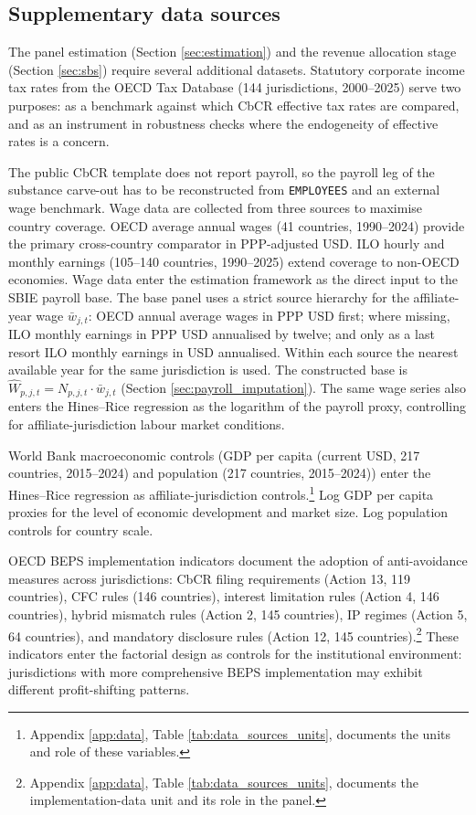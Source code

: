 \documentclass[11pt,a4paper]{article}
\newcommand{\code}[1]{\texttt{#1}}
\begin{document}
\subsection{Supplementary data sources}\label{sec:supplementary}

The panel estimation (Section \ref{sec:estimation}) and the revenue allocation stage (Section \ref{sec:sbs}) require several additional datasets. Statutory corporate income tax rates from the OECD Tax Database (144 jurisdictions, 2000--2025) serve two purposes: as a benchmark against which CbCR effective tax rates are compared, and as an instrument in robustness checks where the endogeneity of effective rates is a concern.

The public CbCR template does not report payroll, so the payroll leg of the substance carve-out has to be reconstructed from \code{EMPLOYEES} and an external wage benchmark. Wage data are collected from three sources to maximise country coverage. OECD average annual wages (41 countries, 1990--2024) provide the primary cross-country comparator in PPP-adjusted USD. ILO hourly and monthly earnings (105--140 countries, 1990--2025) extend coverage to non-OECD economies. Wage data enter the estimation framework as the direct input to the SBIE payroll base. The base panel uses a strict source hierarchy for the affiliate-year wage $\bar{w}_{j,t}$: OECD annual average wages in PPP USD first; where missing, ILO monthly earnings in PPP USD annualised by twelve; and only as a last resort ILO monthly earnings in USD annualised. Within each source the nearest available year for the same jurisdiction is used. The constructed base is $\hat{W}_{p,j,t} = N_{p,j,t} \cdot \bar{w}_{j,t}$ (Section \ref{sec:payroll_imputation}). The same wage series also enters the Hines--Rice regression as the logarithm of the payroll proxy, controlling for affiliate-jurisdiction labour market conditions.

World Bank macroeconomic controls (GDP per capita (current USD, 217 countries, 2015--2024) and population (217 countries, 2015--2024)) enter the Hines--Rice regression as affiliate-jurisdiction controls.\footnote{Appendix \ref{app:data}, Table \ref{tab:data_sources_units}, documents the units and role of these variables.} Log GDP per capita proxies for the level of economic development and market size. Log population controls for country scale.

OECD BEPS implementation indicators document the adoption of anti-avoidance measures across jurisdictions: CbCR filing requirements (Action 13, 119 countries), CFC rules (146 countries), interest limitation rules (Action 4, 146 countries), hybrid mismatch rules (Action 2, 145 countries), IP regimes (Action 5, 64 countries), and mandatory disclosure rules (Action 12, 145 countries).\footnote{Appendix \ref{app:data}, Table \ref{tab:data_sources_units}, documents the implementation-data unit and its role in the panel.} These indicators enter the factorial design as controls for the institutional environment: jurisdictions with more comprehensive BEPS implementation may exhibit different profit-shifting patterns.
\end{document}
